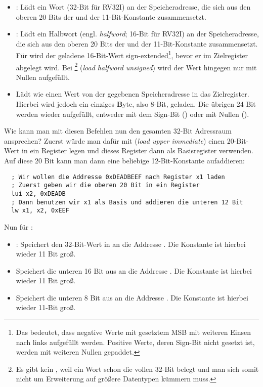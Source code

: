 \begin{itemize}
  \item {}: Lädt ein Wort (32-Bit für RV32I) an der
    Speicheradresse, die sich aus den oberen 20 Bits der  und der
    11-Bit-Konstante  zusammensetzt.
  \item {}: Lädt ein Halbwort
    (engl. \emph{halfword}; 16-Bit für RV32I) an der Speicheradresse, die sich
    aus den oberen 20 Bits der  und der 11-Bit-Konstante
     zusammensetzt. Für  wird der geladene 16-Bit-Wert
    sign-extended\footnote{Das bedeutet, dass negative Werte mit gesetztem MSB
      mit weiteren Einsen nach links aufgefüllt werden. Positive Werte, deren
      Sign-Bit nicht gesetzt ist, werden mit weiteren Nullen gepaddet.}, bevor er im
    Zielregister abgelegt wird. Bei \footnote{Es gibt kein ,
      weil ein Wort schon die vollen 32-Bit belegt und man sich somit nicht um
      Erweiterung auf größere Datentypen kümmern muss.} (\emph{load halfword
      unsigned}) wird der Wert hingegen nur mit Nullen aufgefüllt.
  \item {} Lädt wie  einen Wert von
    der gegebenen Speicheradresse in das Zielregister. Hierbei wird jedoch ein
    einziges \textbf{B}yte, also 8-Bit, geladen. Die übrigen 24 Bit werden wieder
    aufgefüllt, entweder mit dem Sign-Bit () oder mit Nullen
    ().
\end{itemize}

Wie kann man mit diesen Befehlen nun den gesamten 32-Bit Adressraum ansprechen?
Zuerst würde man dafür mit  (\emph{load upper immediate}) einen 20-Bit-Wert
in ein Register legen und dieses Register dann als Basisregister
verwenden. Auf diese 20 Bit kann man dann eine beliebige 12-Bit-Konstante
aufaddieren:

\begin{lstlisting}
  ; Wir wollen die Addresse 0xDEADBEEF nach Register x1 laden
  ; Zuerst geben wir die oberen 20 Bit in ein Register
  lui x2, 0xDEADB
  ; Dann benutzen wir x1 als Basis und addieren die unteren 12 Bit
  lw x1, x2, 0xEEF
\end{lstlisting}

Nun für :

\begin{itemize}
  \item {}: Speichert den 32-Bit-Wert in 
    an die Addresse . Die Konstante  ist
    hierbei wieder 11 Bit groß.
  \item {} Speichert die unteren 16 Bit aus  an die Addresse
    . Die Konstante  ist hierbei wieder
    11 Bit groß.
  \item {} Speichert die unteren 8 Bit aus  an die Addresse
    . Die Konstante  ist hierbei wieder
    11-Bit groß.
\end{itemize}

